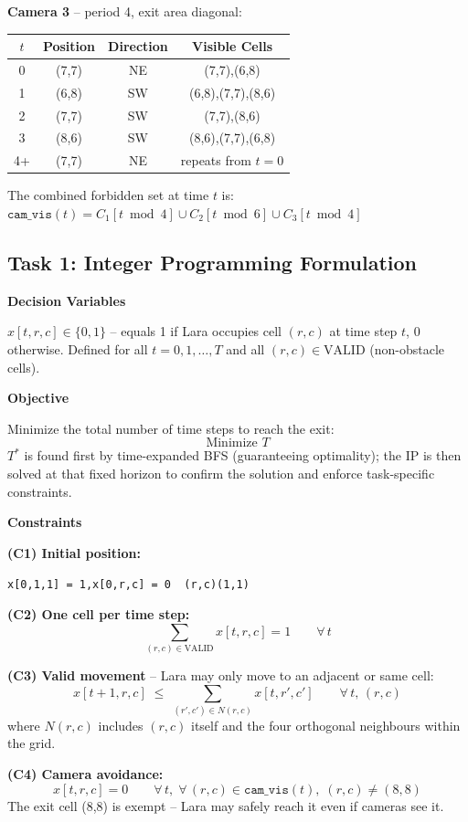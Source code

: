 \documentclass[12pt,a4paper]{article}
\newcommand{\mline}[1]{\par\vspace{2pt}\hspace{1.5em}\texttt{#1}\par\vspace{2pt}}
\begin{document}
\medskip
\textbf{Camera 3} -- period 4, exit area diagonal:

\begin{tabular}{cccc}
\toprule
$t$ & Position & Direction & Visible Cells \\
\midrule
0  & (7,7) & NE & (7,7),(6,8) \\
1  & (6,8) & SW & (6,8),(7,7),(8,6) \\
2  & (7,7) & SW & (7,7),(8,6) \\
3  & (8,6) & SW & (8,6),(7,7),(6,8) \\
4+ & (7,7) & NE & repeats from $t=0$ \\
\bottomrule
\end{tabular}

\medskip
The combined forbidden set at time $t$ is:
$\texttt{cam\_vis}(t) = C_1[t\bmod 4]\cup C_2[t\bmod 6]\cup C_3[t\bmod 4]$

\subsection*{Task 1: Integer Programming Formulation}

\textbf{Decision Variables}

$x[t,r,c]\in\{0,1\}$ -- equals 1 if Lara occupies cell $(r,c)$ at time step $t$, 0 otherwise.
Defined for all $t=0,1,\dots,T$ and all $(r,c)\in\text{VALID}$ (non-obstacle cells).

\textbf{Objective}

Minimize the total number of time steps to reach the exit:
\[
\text{Minimize } T
\]
$T^*$ is found first by time-expanded BFS (guaranteeing optimality); the IP is then solved at
that fixed horizon to confirm the solution and enforce task-specific constraints.

\textbf{Constraints}

\textbf{(C1) Initial position:}
\mline{x[0,1,1] = 1,\quad x[0,r,c] = 0 \; \forall\,(r,c)\neq(1,1)}

\textbf{(C2) One cell per time step:}
\[
\sum_{(r,c)\in\text{VALID}} x[t,r,c] = 1 \qquad \forall\,t
\]

\textbf{(C3) Valid movement} -- Lara may only move to an adjacent or same cell:
\[
x[t+1,r,c] \;\leq\; \sum_{(r',c')\in N(r,c)} x[t,r',c'] \qquad \forall\,t,\,(r,c)
\]
where $N(r,c)$ includes $(r,c)$ itself and the four orthogonal neighbours within the grid.

\textbf{(C4) Camera avoidance:}
\[
x[t,r,c] = 0 \qquad \forall\,t,\;\forall\,(r,c)\in\texttt{cam\_vis}(t),\;(r,c)\neq(8,8)
\]
The exit cell (8,8) is exempt -- Lara may safely reach it even if cameras see it.
\end{document}
